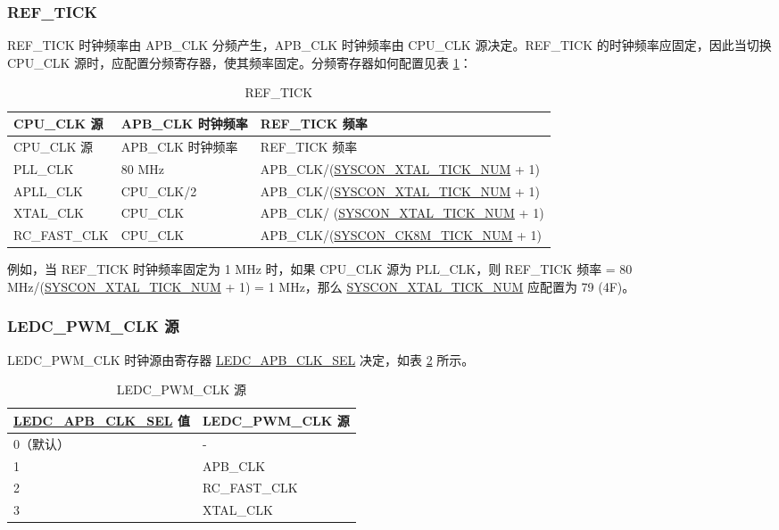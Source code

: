 \documentclass[main\_\_CN.tex]{subfiles}
\begin{document}
\newpage
\subsubsection{REF\_TICK}\label{sec:ref_tick}

REF\_TICK 时钟频率由 APB\_CLK 分频产生，APB\_CLK 时钟频率由 CPU\_CLK 源决定。REF\_TICK 的时钟频率应固定，因此当切换 CPU\_CLK 源时，应配置分频寄存器，使其频率固定。分频寄存器如何配置见表 \ref{table:ref_tick}：

\begin{longtable}[c]{|l|l|l|}
      \caption{REF\_TICK}
    \label{table:ref_tick}
        \\\hline
        \rowcolor{lightgray}
        CPU\_CLK 源 & APB\_CLK 时钟频率 & REF\_TICK 频率\\
        \hline
        \endfirsthead
        \hline
        \rowcolor{lightgray}
        CPU\_CLK 源 & APB\_CLK 时钟频率 & REF\_TICK 频率\\
        \hline
        \endhead
        \endfoot
        PLL\_CLK & 80 MHz & APB\_CLK/(\hyperref[regdesc:SYSCONTICKCONFREG]{SYSCON\_XTAL\_TICK\_NUM} + 1)\\
        \hline
        APLL\_CLK & CPU\_CLK/2 & APB\_CLK/(\hyperref[regdesc:SYSCONTICKCONFREG]{SYSCON\_XTAL\_TICK\_NUM} + 1)\\
        \hline
         XTAL\_CLK & CPU\_CLK & APB\_CLK/ (\hyperref[regdesc:SYSCONTICKCONFREG]{SYSCON\_XTAL\_TICK\_NUM} + 1)\\
        \hline
        RC\_FAST\_CLK & CPU\_CLK & APB\_CLK/(\hyperref[regdesc:SYSCONTICKCONFREG]{SYSCON\_CK8M\_TICK\_NUM} + 1)\\
        \hline
\end{longtable}

例如，当 REF\_TICK 时钟频率固定为 1 MHz 时，如果 CPU\_CLK 源为 PLL\_CLK，则 REF\_TICK 频率 = 80 MHz/(\hyperref[regdesc:SYSCONTICKCONFREG]{SYSCON\_XTAL\_TICK\_NUM} + 1) = 1 MHz，那么 \hyperref[regdesc:SYSCONTICKCONFREG]{SYSCON\_XTAL\_TICK\_NUM} 应配置为 79 (\hexprefix{}4F)。



 \subsubsection{LEDC\_PWM\_CLK 源}

LEDC\_PWM\_CLK 时钟源由寄存器 \hyperref[fielddesc:LEDCAPBCLKSEL]{LEDC\_APB\_CLK\_SEL} 决定，如表 \ref{table:led_sclk} 所示。

    \begin{longtable}[c]{ |p{7.5cm}|p{7.5cm}| } \caption{LEDC\_PWM\_CLK 源}
    \label{table:led_sclk} \\
        \hline
        \rowcolor{lightgray}
        \hyperref[fielddesc:LEDCAPBCLKSEL]{LEDC\_APB\_CLK\_SEL} 值 & LEDC\_PWM\_CLK 源  \\
        \hline
        0（默认）& - \\
        \hline
        1 & APB\_CLK \\
        \hline
        2 & RC\_FAST\_CLK \\
        \hline
        3 & XTAL\_CLK \\
        \hline
\end{longtable}
\end{document}
